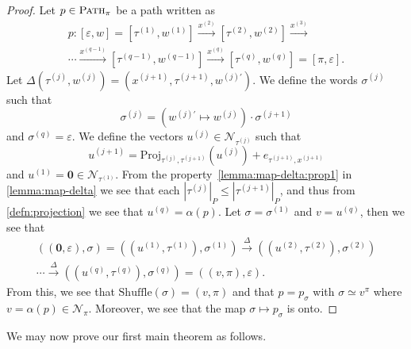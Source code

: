 \begin{proof}
Let $p \in \textsc{Path}_\pi$ be a path written as 
\begin{multline*}
	p \colon
	[\varepsilon,w]
	=
	[\tau^{(1)}, w^{(1)}]
	\xrightarrow{x^{(2)}}
	[\tau^{(2)}, w^{(2)}]
	\xrightarrow{x^{(3)}}\\
	\cdots
	\xrightarrow{x^{(q-1)}}
	[\tau^{(q-1)}, w^{(q-1)}]
	\xrightarrow{x^{(q)}}
	[\tau^{(q)}, w^{(q)}]
	= [\pi, \varepsilon].
\end{multline*}
Let $\Delta(\tau^{(j)},w^{(j)}) = (x^{(j+1)},\tau^{(j+1)},w^{(j)\prime})$.
We define the words $\sigma^{(j)}$ such that
\[
	\sigma^{(j)}
	=
	(w^{(j)\prime}\mapsto w^{(j)})
	\cdot
	\sigma^{(j+1)}
\]
and $\sigma^{(q)} = \varepsilon$.
We define the vectors $u^{(j)} \in \mathcal{N}_{\tau^{(j)}}$ such that
\[
	u^{(j+1)}
	=
	\mathrm{Proj}_{\tau^{(j)},\tau^{(j+1)}}(u^{(j)})
	+ e_{\tau^{(j+1)},x^{(j+1)}}
\]
and $u^{(1)} = \mathbf{0} \in \mathcal{N}_{\tau^{(1)}}$.
From the property~\ref{lemma:map-delta:prop1} in \cref{lemma:map-delta} we see that each $|\tau^{(j)}|_P \leqslant |\tau^{(j+1)}|_P$, and thus from \cref{defn:projection} we see that
$u^{(q)} = \alpha(p)$.
Let $\sigma = \sigma^{(1)}$ and $v = u^{(q)}$, then we see that
\begin{multline*}
	((\mathbf{0},\varepsilon),\sigma)
	=
	((u^{(1)},\tau^{(1)}),\sigma^{(1)})
	\xrightarrow{\Delta}
	((u^{(2)},\tau^{(2)}),\sigma^{(2)})
	\\\cdots
	\xrightarrow{\Delta}
	((u^{(q)},\tau^{(q)}),\sigma^{(q)})
	=
	((v,\pi),\varepsilon).
\end{multline*}
From this, we see that $\mathrm{Shuffle}(\sigma) = (v,\pi)$ and that $p = p_\sigma$ with $\sigma \simeq v^\pi$ where $v = \alpha(p) \in \mathcal{N}_\pi$.
Moreover, we see that the map $\sigma \mapsto p_\sigma$ is onto.
\end{proof}

We may now prove our first main theorem as follows.

\setcounter{theoremx}{0}
\TheoremGeodesicGrowth

